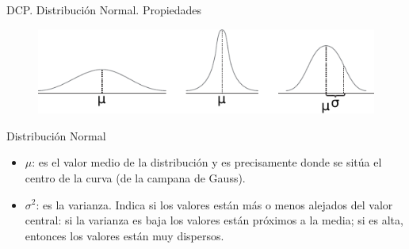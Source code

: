 \documentclass[11pt]{beamer}
\begin{document}
      \begin{frame}{DCP. Distribución Normal. Propiedades}
          \begin{figure}
              \centering
              \includegraphics[width=0.7\linewidth]{images/estadistica11}
              \label{fig:estadistica11}
          \end{figure}

          \begin{block}{Distribuci\'on Normal}
              \begin{itemize}
                  \item $\mu$: es el valor medio de la distribución y es precisamente donde se sitúa el centro de la curva (de la campana de Gauss).
                  \item $\sigma^2$: es la varianza. Indica si los valores están más o menos alejados del valor central: si la varianza es baja los valores están próximos a la media; si es alta, entonces los valores están muy dispersos.
              \end{itemize}
          \end{block}
      \end{frame}
\end{document}
